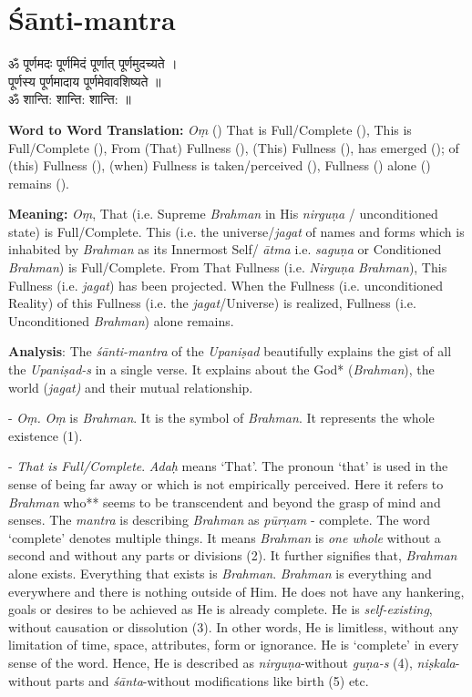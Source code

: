 \chapter{Śānti-mantra}

\begin{moolashloka}
ॐ पूर्णमदः पूर्णमिदं पूर्णात् पूर्णमुदच्यते ।\\
पूर्णस्य पूर्णमादाय पूर्णमेवावशिष्यते ॥\\
ॐ शान्ति: शान्ति: शान्ति: ॥
\end{moolashloka}

\textbf{Word to Word Translation:} \emph{Oṃ} () That is Full/Complete (), This is Full/Complete (), From (That) Fullness (), (This) Fullness (), has emerged (); of (this) Fullness (), (when) Fullness is taken/perceived (), Fullness () alone () remains ().

\textbf{Meaning:} \emph{Oṃ}, That (i.e. Supreme \emph{Brahman} in His \emph{nirguṇa} / unconditioned state) is Full/Complete. This (i.e. the universe/\emph{jagat} of names and forms which is inhabited by \emph{Brahman} as its Innermost Self/ \emph{ātma} i.e. \emph{saguṇa} or Conditioned \emph{Brahman}) is Full/Complete. From That Fullness (i.e. \emph{Nirguṇa} \emph{Brahman}), This Fullness (i.e. \emph{jagat}) has been projected. When the Fullness (i.e. unconditioned Reality) of this Fullness (i.e. the \emph{jagat}/Universe) is realized, Fullness (i.e. Unconditioned \emph{Brahman}) alone remains.

\textbf{Analysis}: The \emph{śānti-mantra} of the \emph{Upaniṣad} beautifully explains the gist of all the \emph{Upaniṣad-s} in a single verse. It explains about the God* (\emph{Brahman}), the world (\emph{jagat)} and their mutual relationship.

- \emph{Oṃ.} \emph{Oṃ} is \emph{Brahman}. It is the symbol of \emph{Brahman}. It represents the whole existence (1).

- \emph{That is Full/Complete}. \emph{Adaḥ} means `That'. The pronoun `that' is used in the sense of being far away or which is not empirically perceived. Here it refers to \emph{Brahman} who** seems to be transcendent and beyond the grasp of mind and senses. The \emph{mantra} is describing \emph{Brahman} as \emph{pūrṇam} - complete. The word `complete' denotes multiple things. It means \emph{Brahman} is \emph{one whole} without a second and without any parts or divisions (2). It further signifies that, \emph{Brahman} alone exists. Everything that exists is \emph{Brahman}. \emph{Brahman} is everything and everywhere and there is nothing outside of Him. He does not have any hankering, goals or desires to be achieved as He is already complete. He is \emph{self-existing}, without causation or dissolution (3). In other words, He is limitless, without any limitation of time, space, attributes, form or ignorance. He is `complete' in every sense of the word. Hence, He is described as \emph{nirguṇa}-without \emph{guṇa-s} (4), \emph{niṣkala}-without parts and \emph{śānta}-without modifications like birth (5) etc.

